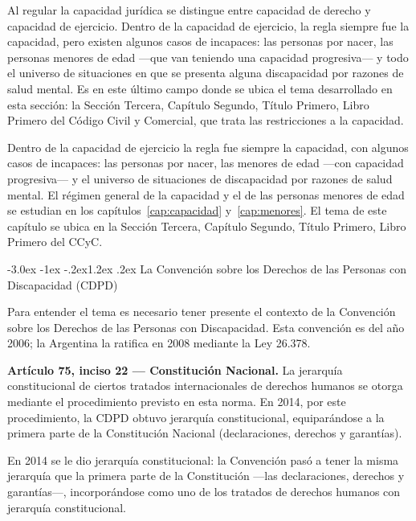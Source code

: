 \documentclass[12pt,oneside]{book}
\makeatletter
\renewcommand\section{\@startsection{section}{1}{\z@}%
  {-3.0ex \@plus -1ex \@minus -.2ex}{1.2ex \@plus .2ex}%
  {\normalfont\large\bfseries\color{acento}}}
\makeatother
\begin{document}
Al regular la capacidad jurídica se distingue entre capacidad de derecho y capacidad de ejercicio. Dentro de la capacidad de ejercicio, la regla siempre fue la capacidad, pero existen algunos casos de incapaces: las personas por nacer, las personas menores de edad ---que van teniendo una capacidad progresiva--- y todo el universo de situaciones en que se presenta alguna discapacidad por razones de salud mental. Es en este último campo donde se ubica el tema desarrollado en esta sección: la Sección Tercera, Capítulo Segundo, Título Primero, Libro Primero del Código Civil y Comercial, que trata las restricciones a la capacidad.

Dentro de la capacidad de ejercicio la regla fue siempre la capacidad, con algunos casos de incapaces: las personas por nacer, las menores de edad ---con capacidad progresiva--- y el universo de situaciones de discapacidad por razones de salud mental. El régimen general de la capacidad y el de las personas menores de edad se estudian en los capítulos~\ref{cap:capacidad} y~\ref{cap:menores}. El tema de este capítulo se ubica en la Sección Tercera, Capítulo Segundo, Título Primero, Libro Primero del CCyC.

\section{La Convención sobre los Derechos de las Personas con Discapacidad (CDPD)}

Para entender el tema es necesario tener presente el contexto de la Convención sobre los Derechos de las Personas con Discapacidad. Esta convención es del año 2006; la Argentina la ratifica en 2008 mediante la Ley 26.378.

\begin{importante}
\textbf{Artículo 75, inciso 22 --- Constitución Nacional.} La jerarquía constitucional de ciertos tratados internacionales de derechos humanos se otorga mediante el procedimiento previsto en esta norma. En 2014, por este procedimiento, la CDPD obtuvo jerarquía constitucional, equiparándose a la primera parte de la Constitución Nacional (declaraciones, derechos y garantías).
\end{importante}

En 2014 se le dio jerarquía constitucional: la Convención pasó a tener la misma jerarquía que la primera parte de la Constitución ---las declaraciones, derechos y garantías---, incorporándose como uno de los tratados de derechos humanos con jerarquía constitucional.
\end{document}
